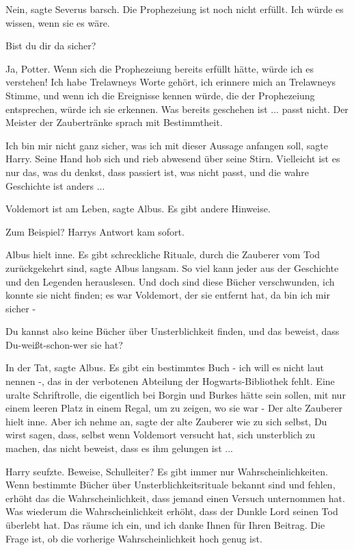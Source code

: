 \glqq{}Nein\grqq{}, sagte Severus barsch. \glqq{}Die Prophezeiung ist noch nicht
erfüllt. Ich würde es wissen, wenn sie es wäre.\grqq{}

\glqq{}Bist du dir da sicher?\grqq{}

\glqq{}Ja, Potter. Wenn sich die Prophezeiung bereits erfüllt hätte, würde ich es
verstehen! Ich habe Trelawneys Worte gehört, ich erinnere mich an Trelawneys
Stimme, und wenn ich die Ereignisse kennen würde, die der Prophezeiung
entsprechen, würde ich sie erkennen. Was bereits geschehen ist ... passt
nicht.\grqq{} Der Meister der Zaubertränke sprach mit Bestimmtheit.

\glqq{}Ich bin mir nicht ganz sicher, was ich mit dieser Aussage anfangen
soll\grqq{}, sagte Harry. Seine Hand hob sich und rieb abwesend über seine
Stirn. \glqq{}Vielleicht ist es nur das, was du denkst, dass passiert ist, was
nicht passt, und die wahre Geschichte ist anders ...\grqq{}

\glqq{}Voldemort ist am Leben\grqq{}, sagte Albus. \glqq{}Es gibt andere
Hinweise.\grqq{}

\glqq{}Zum Beispiel?\grqq{} Harrys Antwort kam sofort.

Albus hielt inne. \glqq{}Es gibt schreckliche Rituale, durch die Zauberer vom Tod
zurückgekehrt sind\grqq{}, sagte Albus langsam. \glqq{}So viel kann jeder aus der
Geschichte und den Legenden herauslesen. Und doch sind diese Bücher
verschwunden, ich konnte sie nicht finden; es war Voldemort, der sie entfernt
hat, da bin ich mir sicher -\grqq{}

\glqq{}Du kannst also keine Bücher über Unsterblichkeit finden, und das beweist,
dass Du-weißt-schon-wer sie hat?\grqq{}

\glqq{}In der Tat\grqq{}, sagte Albus. \glqq{}Es gibt ein bestimmtes Buch - ich
will es nicht laut nennen -, das in der verbotenen Abteilung der
Hogwarts-Bibliothek fehlt. Eine uralte Schriftrolle, die eigentlich bei Borgin
und Burkes hätte sein sollen, mit nur einem leeren Platz in einem Regal, um zu
zeigen, wo sie war -\grqq{} Der alte Zauberer hielt inne. \glqq{}Aber ich nehme
an\grqq{}, sagte der alte Zauberer wie zu sich selbst, \glqq{}Du wirst sagen,
dass, selbst wenn Voldemort versucht hat, sich unsterblich zu machen, das nicht
beweist, dass es ihm gelungen ist ...\grqq{}

Harry seufzte. \glqq{}Beweise, Schulleiter? Es gibt immer nur
Wahrscheinlichkeiten. Wenn bestimmte Bücher über Unsterblichkeitsrituale bekannt
sind und fehlen, erhöht das die Wahrscheinlichkeit, dass jemand einen Versuch
unternommen hat. Was wiederum die Wahrscheinlichkeit erhöht, dass der Dunkle
Lord seinen Tod überlebt hat. Das räume ich ein, und ich danke Ihnen für Ihren
Beitrag. Die Frage ist, ob die vorherige Wahrscheinlichkeit hoch genug
ist.\grqq{}

